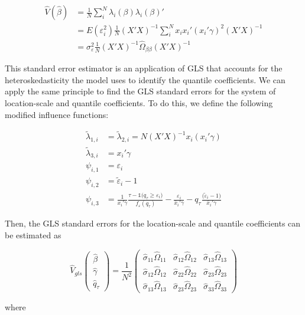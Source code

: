 \documentclass[
  authoryear,
  review,
  1p]{elsarticle}
\begin{document}
\[\begin{aligned}
\hat V(\hat \beta) &= \frac{1}{N} \sum_i^N \lambda_{i}(\beta) \lambda_{i}(\beta)' \\
&= E(\varepsilon_i^2) \frac{1}{N}  (X'X)^{-1}  \sum_i^N x_i x_i' ( x_i'\gamma)^2 (X'X)^{-1} \\
&= \sigma^2_{\varepsilon} \frac{1}{N}  (X'X)^{-1}  \hat\Omega_{\beta\beta} (X'X)^{-1}  
\end{aligned}
\]

This standard error estimator is an application of GLS that accounts for
the heteroskedasticity the model uses to identify the quantile
coefficients. We can apply the same principle to find the GLS standard
errors for the system of location-scale and quantile coefficients. To do
this, we define the following modified influence functions:

\[\begin{aligned}
\tilde \lambda_{1,i}&=\tilde \lambda_{2,i}=N (X'X)^{-1}  x_i ( x_i'\gamma) \\  
\tilde \lambda_{3,i}&=x_i' \gamma  \\
 \psi_{i,1} &= \varepsilon_i \\
 \psi_{i,2} &= \tilde \varepsilon_i -1 \\
 \psi_{i,3} &= \frac{1}{ x_i' \gamma }\frac{\tau-\mathbb{1}\big( q_\tau  \geq \varepsilon_i  \big) }{ f_{\varepsilon}(q_\tau)} - \frac{\varepsilon_i }{\bar x_i'\gamma} 
-  q_\tau \frac{(\tilde \varepsilon_i -1\big)}{\bar x_i'\gamma}
\end{aligned}
\]

Then, the GLS standard errors for the location-scale and quantile
coefficients can be estimated as

\[\hat{V}_{gls}
  \begin{pmatrix}
  \hat\beta \\
  \hat\gamma \\
  \hat q_\tau
  \end{pmatrix}
 = \frac{1}{N^2} 
 \begin{pmatrix}
 \hat\sigma_{11} \hat\Omega_{11} & \hat\sigma_{12} \hat\Omega_{12} & \hat\sigma_{13} \hat\Omega_{13} \\
 \hat\sigma_{12} \hat\Omega_{12} & \hat\sigma_{22} \hat\Omega_{22} & \hat\sigma_{23} \hat\Omega_{23} \\
 \hat\sigma_{13} \hat\Omega_{13} & \hat\sigma_{23} \hat\Omega_{23} & \hat\sigma_{33} \hat\Omega_{33}
  \end{pmatrix}
\]

where
\end{document}
